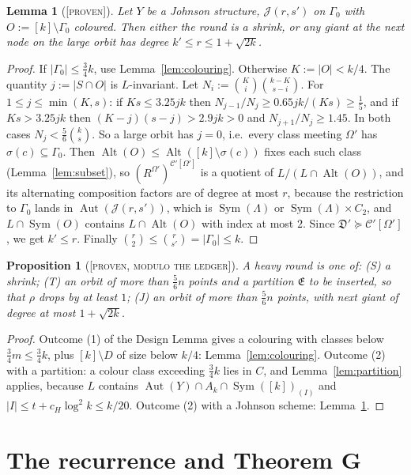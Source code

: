 \documentclass[11pt]{article}
\newtheorem{lemma}[theorem]{Lemma}
\newtheorem{proposition}[theorem]{Proposition}
\theoremstyle{definition}
\theoremstyle{remark}
\newcommand{\Sym}{\operatorname{Sym}}
\newcommand{\Alt}{\operatorname{Alt}}
\newcommand{\Aut}{\operatorname{Aut}}
\newcommand{\C}{\mathcal C}
\newcommand{\fD}{\mathfrak D}
\newcommand{\fE}{\mathfrak E}
\newcommand{\Proven}{\textsc{[proven]}}
\newcommand{\ProvenM}{\textsc{[proven, modulo the ledger]}}
\begin{document}
\begin{lemma}[\Proven]\label{lem:johnson}
Let $Y$ be a Johnson structure, $\mathcal J(r,s')$ on $\Gamma_0$ with $O:=[k]\setminus\Gamma_0$ coloured. Then either the round is a shrink, or any giant at the next node on the large orbit has degree $k'\le r\le1+\sqrt{2k}$.
\end{lemma}
\begin{proof}
If $|\Gamma_0|\le\tfrac34k$, use Lemma~\ref{lem:colouring}. Otherwise $K:=|O|<k/4$. The quantity $j:=|S\cap O|$ is $L$-invariant. Let $N_i:=\binom Ki\binom{k-K}{s-i}$. For $1\le j\le\min(K,s)$: if $Ks\le3.25jk$ then $N_{j-1}/N_j\ge 0.65jk/(Ks)\ge\tfrac15$, and if $Ks>3.25jk$ then $(K-j)(s-j)>2.9jk>0$ and $N_{j+1}/N_j\ge1.45$. In both cases $N_j<\tfrac56\binom ks$. So a large orbit has $j=0$, i.e.\ every class meeting $\Omega'$ has $\sigma(c)\subseteq\Gamma_0$. Then $\Alt(O)\le\Alt([k]\setminus\sigma(c))$ fixes each such class (Lemma~\ref{lem:subset}), so $(R^{\Omega'})^{\C'[\Omega']}$ is a quotient of $L/(L\cap\Alt(O))$, and its alternating composition factors are of degree at most $r$, because the restriction to $\Gamma_0$ lands in $\Aut(\mathcal J(r,s'))$, which is $\Sym(\Lambda)$ or $\Sym(\Lambda)\times C_2$, and $L\cap\Sym(O)$ contains $L\cap\Alt(O)$ with index at most $2$. Since $\fD'\succeq\C'[\Omega']$, we get $k'\le r$. Finally $\binom r2\le\binom r{s'}=|\Gamma_0|\le k$.
\end{proof}

\begin{proposition}[\ProvenM]\label{prop:trichotomy}
A heavy round is one of: \textup{(S)} a shrink; \textup{(T)} an orbit of more than $\tfrac56n$ points and a partition $\fE$ to be inserted, so that $\rho$ drops by at least $1$; \textup{(J)} an orbit of more than $\tfrac56n$ points, with next giant of degree at most $1+\sqrt{2k}$.
\end{proposition}
\begin{proof}
Outcome (1) of the Design Lemma gives a colouring with classes below $\tfrac34m\le\tfrac34k$, plus $[k]\setminus D$ of size below $k/4$: Lemma~\ref{lem:colouring}. Outcome (2) with a partition: a colour class exceeding $\tfrac34k$ lies in $C$, and Lemma~\ref{lem:partition} applies, because $L$ contains $\Aut(Y)\cap A_k\cap\Sym([k])_{(I)}$ and $|I|\le t+c_H\log^2k\le k/20$. Outcome (2) with a Johnson scheme: Lemma~\ref{lem:johnson}.
\end{proof}

\section{The recurrence and Theorem G}\label{sec:recurrence}
\end{document}
